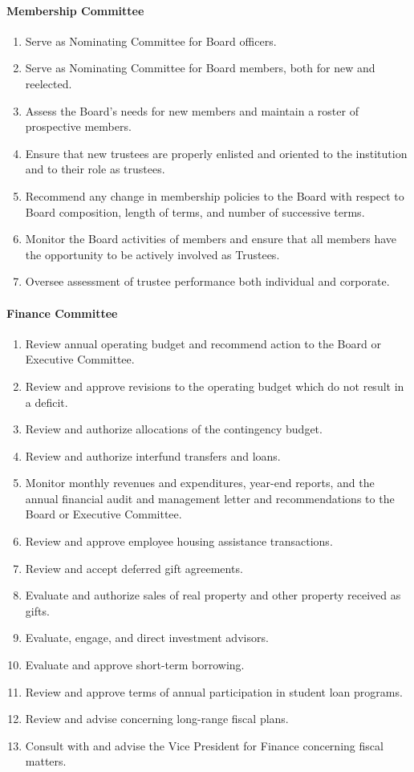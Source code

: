 			\paragraph{Membership Committee}
				\begin{enumerate}
					\item{Serve as Nominating Committee for Board officers.}
					\item{Serve as Nominating Committee for Board members, both for new and reelected.}
					\item{Assess the Board's needs for new members and maintain a roster of prospective members.}
					\item{Ensure that new trustees are properly enlisted and oriented to the institution and to their role as trustees.}
					\item{Recommend any change in membership policies to the Board with respect to Board composition, length of terms, and number of successive terms.}
					\item{Monitor the Board activities of members and ensure that all members have the opportunity to be actively involved as Trustees.}
					\item{Oversee assessment of trustee performance both individual and corporate.}
				\end{enumerate}
			\paragraph{Finance Committee}
				\begin{enumerate}
					\item{Review annual operating budget and recommend action to the Board or Executive Committee.}
					\item{Review and approve revisions to the operating budget which do not result in a deficit.}
					\item{Review and authorize allocations of the contingency budget.}
					\item{Review and authorize interfund transfers and loans.}
					\item{Monitor monthly revenues and expenditures, year-end reports, and the annual financial audit and management letter and recommendations to the Board or Executive Committee.}
					\item{Review and approve employee housing assistance transactions.}
					\item{Review and accept deferred gift agreements.}
					\item{Evaluate and authorize sales of real property and other property received as gifts.}
					\item{Evaluate, engage, and direct investment advisors.}
					\item{Evaluate and approve short-term borrowing.}
					\item{Review and approve terms of annual participation in student loan programs.}
					\item{Review and advise concerning long-range fiscal plans.}
					\item{Consult with and advise the Vice President for Finance concerning fiscal matters.}
				\end{enumerate}
